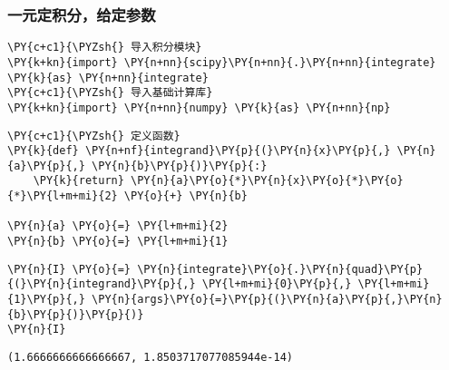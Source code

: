     \hypertarget{ux4e00ux5143ux5b9aux79efux5206ux7ed9ux5b9aux53c2ux6570}{%
\subsubsection{一元定积分，给定参数}\label{ux4e00ux5143ux5b9aux79efux5206ux7ed9ux5b9aux53c2ux6570}}

    \begin{tcolorbox}[breakable, size=fbox, boxrule=1pt, pad at break*=1mm,colback=cellbackground, colframe=cellborder]
\begin{Verbatim}[commandchars=\\\{\}]
\PY{c+c1}{\PYZsh{} 导入积分模块}
\PY{k+kn}{import} \PY{n+nn}{scipy}\PY{n+nn}{.}\PY{n+nn}{integrate} \PY{k}{as} \PY{n+nn}{integrate}
\PY{c+c1}{\PYZsh{} 导入基础计算库}
\PY{k+kn}{import} \PY{n+nn}{numpy} \PY{k}{as} \PY{n+nn}{np}
\end{Verbatim}
\end{tcolorbox}

    \begin{tcolorbox}[breakable, size=fbox, boxrule=1pt, pad at break*=1mm,colback=cellbackground, colframe=cellborder]
\begin{Verbatim}[commandchars=\\\{\}]
\PY{c+c1}{\PYZsh{} 定义函数}
\PY{k}{def} \PY{n+nf}{integrand}\PY{p}{(}\PY{n}{x}\PY{p}{,} \PY{n}{a}\PY{p}{,} \PY{n}{b}\PY{p}{)}\PY{p}{:}
    \PY{k}{return} \PY{n}{a}\PY{o}{*}\PY{n}{x}\PY{o}{*}\PY{o}{*}\PY{l+m+mi}{2} \PY{o}{+} \PY{n}{b}

\PY{n}{a} \PY{o}{=} \PY{l+m+mi}{2}
\PY{n}{b} \PY{o}{=} \PY{l+m+mi}{1}
\end{Verbatim}
\end{tcolorbox}

    \begin{tcolorbox}[breakable, size=fbox, boxrule=1pt, pad at break*=1mm,colback=cellbackground, colframe=cellborder]
\begin{Verbatim}[commandchars=\\\{\}]
\PY{n}{I} \PY{o}{=} \PY{n}{integrate}\PY{o}{.}\PY{n}{quad}\PY{p}{(}\PY{n}{integrand}\PY{p}{,} \PY{l+m+mi}{0}\PY{p}{,} \PY{l+m+mi}{1}\PY{p}{,} \PY{n}{args}\PY{o}{=}\PY{p}{(}\PY{n}{a}\PY{p}{,}\PY{n}{b}\PY{p}{)}\PY{p}{)}
\PY{n}{I}
\end{Verbatim}
\end{tcolorbox}

            \begin{tcolorbox}[breakable, size=fbox, boxrule=.5pt, pad at break*=1mm, opacityfill=0]
\begin{Verbatim}[commandchars=\\\{\}]
(1.6666666666666667, 1.8503717077085944e-14)
\end{Verbatim}
\end{tcolorbox}
